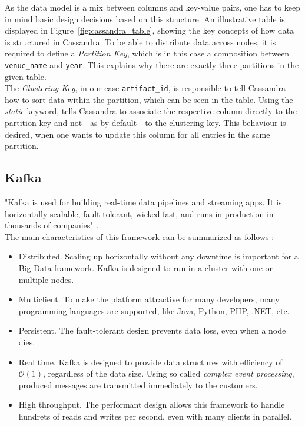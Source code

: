 As the data model is a mix between columns and key-value pairs, one has to keep in mind basic design decisions based on this structure.
An illustrative table is displayed in Figure~\ref{fig:cassandra_table}, showing the key concepts of how data is structured in Cassandra.
To be able to distribute data across nodes, it is required to define a \textit{Partition Key}, which is in this case a composition between \verb|venue_name| and \verb|year|.
This explains why there are exactly three partitions in the given table.\\
The \textit{Clustering Key}, in our case \verb|artifact_id|, is responsible to tell Cassandra how to sort data within the partition, which can be seen in the table.
Using the \textit{static} keyword, tells Cassandra to associate the respective column directly to the partition key and not - as by default - to the clustering key.
This behaviour is desired, when one wants to update this column for all entries in the same partition.


\subsection{Kafka}
"Kafka is used for building real-time data pipelines and streaming apps.
It is horizontally scalable, fault-tolerant, wicked fast, and runs in production in thousands of companies" \cite{apache_kafka}.\\
The main characteristics of this framework can be summarized as follows \cite{estrada2016big}:
\begin{itemize}
    \item Distributed. Scaling up horizontally without any downtime is important for a Big Data framework.
        Kafka is designed to run in a cluster with one or multiple nodes.
    \item Multiclient. To make the platform attractive for many developers, many programming languages are supported, like Java, Python, PHP, .NET, etc.
    \item Persistent. The fault-tolerant design prevents data loss, even when a node dies.
    \item Real time. Kafka is designed to provide data structures with efficiency of $\mathcal{O}(1)$, regardless of the data size.
        Using so called \textit{complex event processing}, produced messages are transmitted immediately to the customers.
    \item High throughput. The performant design allows this framework to handle hundrets of reads and writes per second, even with many clients in parallel.
\end{itemize}

